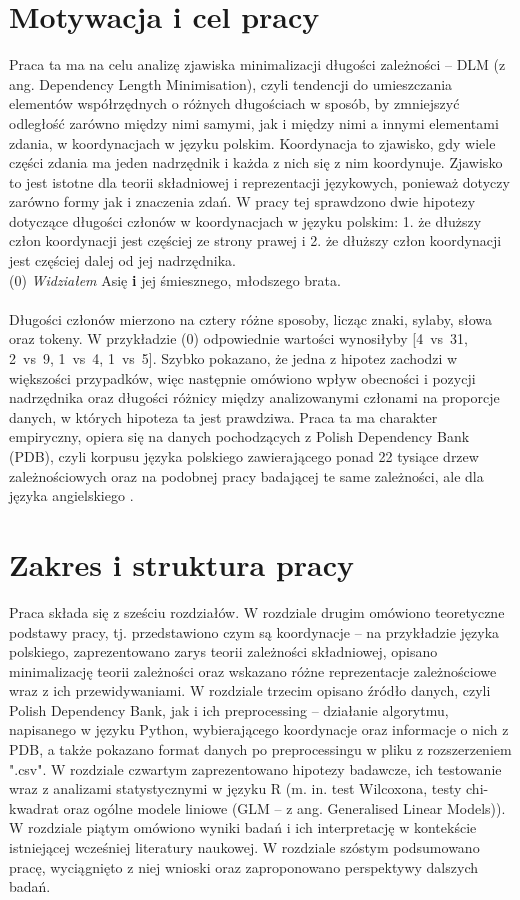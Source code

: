 \documentclass[licencjacka]{pracamgr_Kogni}
\begin{document}
\section{Motywacja i cel pracy}
Praca ta ma na celu analizę zjawiska minimalizacji długości zależności – DLM (z ang. Dependency Length Minimisation), czyli tendencji do umieszczania elementów współrzędnych o różnych długościach w sposób, by zmniejszyć odległość zarówno między nimi samymi, jak i między nimi a innymi elementami zdania, w koordynacjach w języku polskim. Koordynacja to zjawisko, gdy wiele części zdania ma jeden nadrzędnik i każda z nich się z nim koordynuje. Zjawisko to jest istotne dla teorii składniowej i reprezentacji językowych, ponieważ dotyczy zarówno formy jak i znaczenia zdań. W pracy tej sprawdzono dwie hipotezy dotyczące długości członów w koordynacjach w języku polskim: 1. że dłuższy człon koordynacji jest częściej ze strony prawej i 2. że dłuższy człon koordynacji jest częściej dalej od jej nadrzędnika.
\\

(0) \textit{Widziałem} Asię \textbf{i} jej śmiesznego, młodszego brata. \\
\\
Długości członów mierzono na cztery różne sposoby, licząc znaki, sylaby, słowa oraz tokeny. W przykładzie (0) odpowiednie wartości wynosiłyby [4~vs~31, 2~vs~9, 1~vs~4, 1~vs~5]. Szybko pokazano, że jedna z hipotez zachodzi w większości przypadków, więc następnie omówiono wpływ obecności i pozycji nadrzędnika oraz długości różnicy między analizowanymi członami na proporcje danych, w których hipoteza ta jest prawdziwa. Praca ta ma charakter empiryczny, opiera się na danych pochodzących z Polish Dependency Bank (PDB), czyli korpusu języka polskiego zawierającego ponad 22 tysiące drzew zależnościowych oraz na podobnej pracy badającej te same zależności, ale dla języka angielskiego \citep{AnonimoweNieopublikowane}.

\section{Zakres i struktura pracy}
Praca składa się z sześciu rozdziałów. W rozdziale drugim omówiono teoretyczne podstawy pracy, tj. przedstawiono czym są koordynacje -- na przykładzie języka polskiego, zaprezentowano zarys teorii zależności składniowej, opisano minimalizację teorii zależności oraz wskazano różne reprezentacje zależnościowe wraz z ich przewidywaniami. W rozdziale trzecim opisano źródło danych, czyli Polish Dependency Bank, jak i ich preprocessing -- działanie algorytmu, napisanego w języku Python, wybierającego koordynacje oraz informacje o nich z PDB, a także pokazano format danych po preprocessingu w pliku z rozszerzeniem ".csv". W rozdziale czwartym zaprezentowano hipotezy badawcze, ich testowanie wraz z analizami statystycznymi w języku R (m. in. test Wilcoxona, testy chi-kwadrat oraz ogólne modele liniowe (GLM – z ang. Generalised Linear Models)). W rozdziale piątym omówiono wyniki badań i ich interpretację w kontekście istniejącej wcześniej literatury naukowej. W rozdziale szóstym podsumowano pracę, wyciągnięto z niej wnioski oraz zaproponowano perspektywy dalszych badań. 
\end{document}
